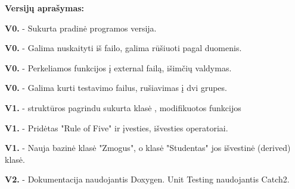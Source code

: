 

{\bfseries{Versijų aprašymas\+:}}


\begin{DoxyItemize}
\item {\bfseries{V0.}} -\/ Sukurta pradinė programos versija.
\item {\bfseries{V0.}} -\/ Galima nuskaityti iš failo, galima rūšiuoti pagal duomenis.
\item {\bfseries{V0.}} -\/ Perkeliamos funkcijos į external failą, išimčių valdymas.
\item {\bfseries{V0.}} -\/ Galima kurti testavimo failus, rušiavimas į dvi grupes.
\item {\bfseries{V1.}} -\/  struktūros pagrindu sukurta klasė , modifikuotos funkcijos
\item {\bfseries{V1.}} -\/ Pridėtas "{}\+Rule of Five"{} ir įvesties, išvesties operatoriai.
\item {\bfseries{V1.}} -\/ Nauja bazinė klasė "{}\+Zmogus"{}, o klasė "{}\+Studentas"{} jos išvestinė (derived) klasė.
\item {\bfseries{V2.}} -\/ Dokumentacija naudojantis Doxygen. Unit Testing naudojantis Catch2. 
\end{DoxyItemize}